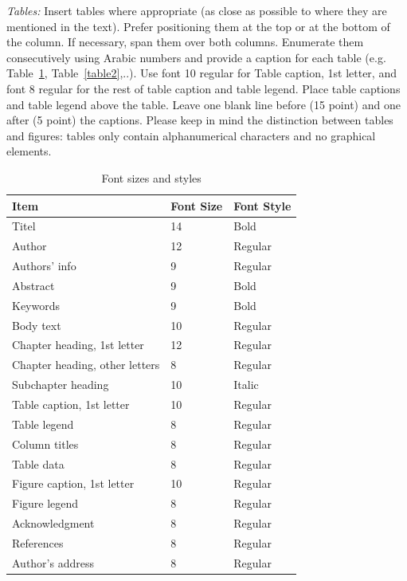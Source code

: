 \documentclass[nouppercase]{ifmbe}
\begin{document}
\textit{Tables:} Insert tables where appropriate (as close as possible
to where they are mentioned in the text). Prefer positioning them at the
top or at the bottom of the column. If necessary, span them over both
columns. Enumerate them consecutively using Arabic numbers and provide a
caption for each table (e.g. Table~\ref{table1}, Table~\ref{table2},..).
Use font 10 regular for Table caption, 1st letter, and font 8 regular
for the rest of table caption and table legend. Place table captions and
table legend above the table. Leave one blank line before (15 point) and
one after (5 point) the captions. Please keep in mind the distinction
between tables and figures: tables only contain alphanumerical
characters and no graphical elements.

\begin{table}[ht]
  \footnotesize \onehalfspacing
  \caption{Font sizes and styles}
  \begin{tabular}{p{3.90cm}p{1.40cm}p{1.90cm}}
     \hline
     \normalfont Item & Font Size & Font Style \\
     \hline
     Titel & 14 & Bold\\
     Author & 12 & Regular\\
     Authors' info & 9 & Regular\\
     Abstract & 9 & Bold\\
     Keywords & 9 & Bold\\
     Body text & 10 & Regular\\
     Chapter heading, 1st letter & 12 & Regular\\
     Chapter heading, other letters & 8 & Regular\\
     Subchapter heading & 10 & Italic\\
     Table caption, 1st letter & 10 & Regular\\
     Table legend & 8 & Regular\\
     Column titles & 8 & Regular\\
     Table data & 8 & Regular\\
     Figure caption, 1st letter & 10 & Regular\\
     Figure legend & 8 & Regular\\
     Acknowledgment & 8 & Regular\\
     References & 8 & Regular\\
     Author's address & 8 & Regular\\
     \hline
  \end{tabular}
  \label{table1}
\end{table}
\end{document}
